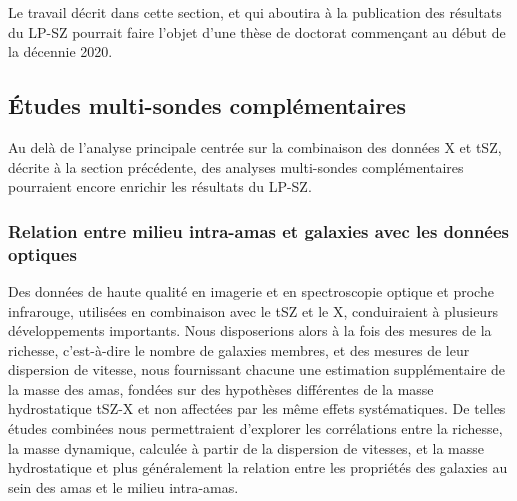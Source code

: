 Le travail décrit dans cette section, et qui aboutira à la
publication des résultats du LP-SZ pourrait faire l'objet d'une thèse
de doctorat commençant au début de la décennie 2020. 

\subsection{\'Etudes multi-sondes complémentaires}

Au delà de l'analyse principale centrée sur la combinaison des données
X et tSZ, décrite à la section précédente, des analyses multi-sondes
complémentaires pourraient encore enrichir les résultats du LP-SZ. 

\subsubsection{Relation entre milieu intra-amas et galaxies avec les
  données optiques}

Des données de haute qualité en imagerie et en spectroscopie optique
et proche infrarouge, utilisées en combinaison avec le tSZ et le X,
conduiraient à plusieurs développements importants. Nous disposerions
alors à la fois des mesures de la richesse, c'est-à-dire le nombre de
galaxies membres, et des mesures de leur dispersion de vitesse, nous
fournissant chacune une estimation supplémentaire de la masse des
amas, fondées sur des hypothèses différentes de la masse hydrostatique
tSZ-X et non affectées par les même effets systématiques. De telles
études combinées nous permettraient d'explorer les corrélations entre
la richesse, la masse dynamique, calculée à partir de la dispersion de
vitesses, et la masse hydrostatique et plus généralement la relation
entre les propriétés des galaxies au sein des amas et le milieu
intra-amas.

